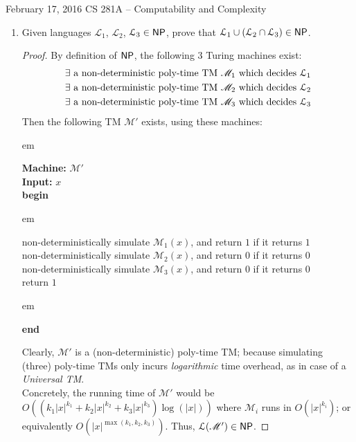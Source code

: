 \documentclass[usletter]{article}
\newcommand {\langset}[1]      {\ensuremath{\mathcal{#1}}}
\newcommand {\machine}[1]      {\ensuremath{\mathscr{#1}}}
\newcommand {\family}[1]       {\ensuremath{\textnormal{\textsf{#1}}}}
\newcommand {\term}[1]      {\textit{#1}}
\newcommand {\indpar}[1]   {
  \par\leftskip=#1em
  \noindent\ignorespaces
}
\newenvironment{turing}[2] {
  \smallskip
  \indpar{2}
  \textbf{Machine:} #1\\
  \textbf{Input:} $#2$\\[5pt]
  \textbf{begin}
  \parskip=0pt
  \indpar{3}
}{
  \indpar{2}
  \textbf{end}
  \par\medskip
}
\newcommand {\langL}          {\langset{L}}
\newcommand {\machineM}       {\machine{M}}
\begin{document}
 {February 17, 2016}
            {CS 281A -- Computability and Complexity}

\begin{enumerate}
  \item Given languages $\langL_1$, $\langL_2$, $\langL_3 \in \family{NP}$,
        prove that $\langL_1 \cup (\langL_2 \cap \langL_3) \in \family{NP}$.
  \begin{proof}
    By definition of \family{NP}, the following $3$ Turing machines exist:
    \begin{align}
      \label{q1_m1} \exists \textnormal{ a non-deterministic poly-time TM }
                      \machineM_1 \textnormal{ which decides } \langL_1 \\
      \label{q1_m2} \exists \textnormal{ a non-deterministic poly-time TM }
                      \machineM_2 \textnormal{ which decides } \langL_2 \\
      \label{q1_m3} \exists \textnormal{ a non-deterministic poly-time TM }
                      \machineM_3 \textnormal{ which decides } \langL_3
    \end{align}
    Then the following TM $\machineM'$ exists, using these machines:
    \begin{turing}{$\machineM'$}{x}
      non-deterministically simulate $\machineM_1(x)$,
        and return $1$ if it returns $1$ \\
      non-deterministically simulate $\machineM_2(x)$,
        and return $0$ if it returns $0$ \\
      non-deterministically simulate $\machineM_3(x)$,
        and return $0$ if it returns $0$ \\
      return $1$
    \end{turing}
    Clearly, $\machineM'$ is a (non-deterministic) poly-time TM;
    because simulating (three) poly-time TMs only incurs \textit{logarithmic}
    time overhead, as in case of a \term{Universal TM}. \\
    Concretely, the running time of $\machineM'$ would be
    $O((k_1 |x|^{k_1} + k_2 |x|^{k_2} + k_3 |x|^{k_3}) \log(|x|))$
    where $\machineM_i$ runs in $O(|x|^{k_i})$;
    or equivalently $O(|x|^{\max(k_1, k_2, k_3)})$.
    Thus, $\langL(\machineM') \in \family{NP}$.


\end{proof}
\end{enumerate}
\end{document}
